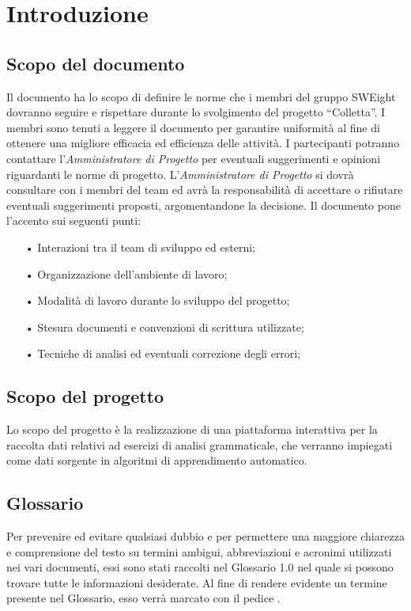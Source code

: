 \section{Introduzione}
\subsection{Scopo del documento}
Il documento ha lo scopo di definire le norme che i membri del gruppo SWEight dovranno seguire e rispettare durante lo svolgimento del progetto “Colletta”. 
I membri sono tenuti a leggere il documento per garantire uniformità al fine di ottenere una migliore efficacia ed efficienza delle attività. I partecipanti potranno contattare l'\textit{Amministratore di Progetto} per eventuali suggerimenti e opinioni riguardanti le norme di progetto. 
L'\textit{Amministratore di Progetto} si dovrà consultare con i membri del team ed avrà la responsabilità di accettare o rifiutare eventuali suggerimenti proposti, argomentandone la decisione.
Il documento pone l'accento sui seguenti punti:
\begin{itemize}
\item[•] Interazioni tra il team di sviluppo ed esterni;
\item[•] Organizzazione dell'ambiente di lavoro;
\item[•] Modalità di lavoro durante lo sviluppo del progetto;
\item[•] Stesura documenti e convenzioni di scrittura utilizzate;
\item[•] Tecniche di analisi ed eventuali correzione degli errori;	
\end{itemize}
\subsection{Scopo del progetto}
Lo scopo del progetto è la realizzazione di una piattaforma interattiva per la raccolta dati relativi ad esercizi di analisi grammaticale, che verranno impiegati come dati sorgente in algoritmi di apprendimento automatico. %
\subsection{Glossario}
Per prevenire ed evitare qualsiasi dubbio e per permettere una maggiore chiarezza e comprensione del testo su termini ambigui, abbreviazioni e acronimi utilizzati nei vari documenti, essi sono stati raccolti nel Glossario 1.0 nel quale si possono trovare tutte le informazioni desiderate. Al fine di rendere evidente un termine presente nel Glossario, esso verrà marcato con il pedice .
